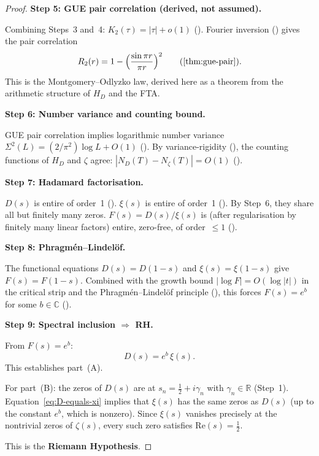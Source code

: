 \documentclass[11pt,a4paper]{article}
\theoremstyle{plain}
\theoremstyle{remark}
\newcommand{\C}{\mathbb{C}}
\newcommand{\R}{\mathbb{R}}
\begin{document}
\begin{proof}
\medskip
\noindent\textbf{Step 5: GUE pair correlation (derived, not assumed).}

Combining Steps~3 and~4: $K_2(\tau)=|\tau|+o(1)$
().  Fourier inversion ()
gives the pair correlation
\[
  R_2(r)=1-\Bigl(\frac{\sin\pi r}{\pi r}\Bigr)^2
  \qquad(\text{\Cref{thm:gue-pair}}).
\]
This is the Montgomery--Odlyzko law, derived here as a theorem from
the arithmetic structure of $H_D$ and the FTA.

\medskip
\noindent\textbf{Step 6: Number variance and counting bound.}

GUE pair correlation implies logarithmic number variance
$\Sigma^2(L)=(2/\pi^2)\log L+O(1)$ ().
By variance-rigidity (), the counting
functions of $H_D$ and $\zeta$ agree:
$|N_D(T)-N_\zeta(T)|=O(1)$ ().

\medskip
\noindent\textbf{Step 7: Hadamard factorisation.}

$D(s)$ is entire of order~1 ().
$\xi(s)$ is entire of order~1 (\cite{titchmarsh1986}).
By Step~6, they share all but finitely many zeros.
$F(s)=D(s)/\xi(s)$ is (after regularisation by finitely many linear
factors) entire, zero-free, of order~$\leq 1$ ().

\medskip
\noindent\textbf{Step 8: Phragm\'en--Lindel\"of.}

The functional equations $D(s)=D(1-s)$ and $\xi(s)=\xi(1-s)$ give
$F(s)=F(1-s)$.  Combined with the growth bound $|\log F|=O(\log|t|)$
in the critical strip and the Phragm\'en--Lindel\"of principle
(), this forces $F(s)=e^b$ for some
$b\in\C$ ().

\medskip
\noindent\textbf{Step 9: Spectral inclusion $\Rightarrow$ RH.}

From $F(s)=e^b$:
\begin{equation}\label{eq:D-equals-xi}
  D(s)=e^b\,\xi(s).
\end{equation}
This establishes part~(A).

For part~(B): the zeros of $D(s)$ are at
$s_n=\frac{1}{2}+i\gamma_n$ with $\gamma_n\in\R$ (Step~1).
Equation~\eqref{eq:D-equals-xi} implies that $\xi(s)$ has the
same zeros as $D(s)$ (up to the constant $e^b$, which is nonzero).
Since $\xi(s)$ vanishes precisely at the nontrivial zeros of $\zeta(s)$,
every such zero satisfies $\mathrm{Re}(s)=\frac{1}{2}$.

This is the \textbf{Riemann Hypothesis}.
\end{proof}
\end{document}
